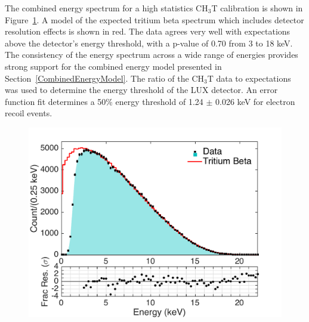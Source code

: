 The combined energy spectrum for a high statistics CH$_3$T calibration is shown in Figure~\ref{TritiumSpectrum}.  A model of the expected tritium beta spectrum which includes detector resolution effects is shown in red.  The data agrees very well with expectations above the detector's energy threshold, with a p-value of 0.70 from 3 to 18 keV.  The consistency of the energy spectrum across a wide range of energies provides strong support for the combined energy model presented in Section~\ref{CombinedEnergyModel}.  The ratio of the CH$_3$T data to expectations was used to determine the energy threshold of the LUX detector.  An error function fit determines a 50\% energy threshold of 1.24 $\pm$ 0.026 keV for electron recoil events.


\begin{figure} [!h]
\includegraphics[scale=.425]{TritiumSpectrum.pdf} 
\label{TritiumSpectrum}
\end{figure}

